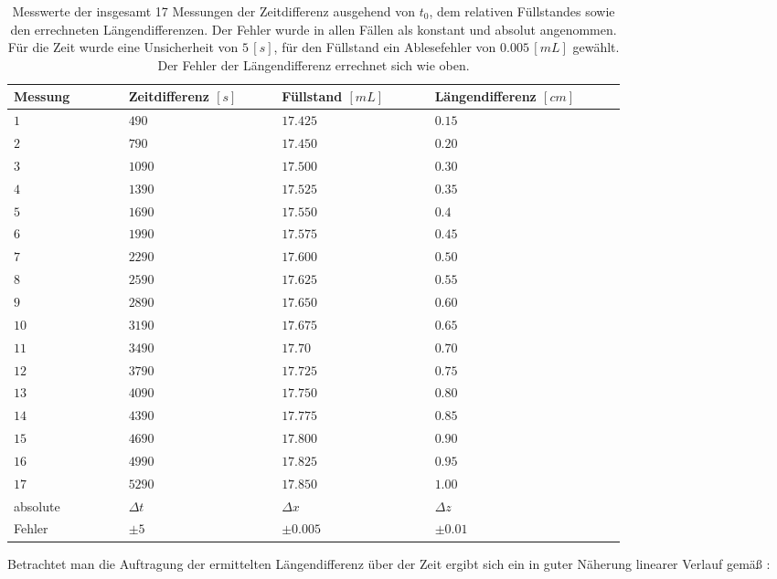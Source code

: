 \begin{table}[H]
	\centering
	\label{Messdaten}
	\caption{Messwerte der insgesamt 17 Messungen der Zeitdifferenz ausgehend von $t_0$, dem relativen Füllstandes sowie den errechneten Längendifferenzen. Der Fehler wurde in allen Fällen als konstant und absolut angenommen. Für die Zeit wurde eine Unsicherheit von $5\,[\si{s}]$, für den Füllstand ein Ablesefehler von $0.005 \,[\si{mL}]$ gewählt. Der Fehler der Längendifferenz errechnet sich wie oben.\\}
	\begin{tabular}{C{0.15\linewidth}|C{0.2\linewidth}C{0.2\linewidth}C{0.25\linewidth}}
		Messung  &  Zeitdifferenz $\left[\si{s}\right] $ &  Füllstand $\left[\si{mL}\right] $ & Längendifferenz $[\si{cm}]$\\
		\hline \addlinespace[1ex] 
		$ 1$ & $ 490 $ & $17.425$ & $0.15$\\
		$2$ & $790$& $ 17.450$ &$0.20$\\
		$3$ & $1090$& $17.500$  &$0.30$\\
		$4$ &$1390$& $17.525$ &$0.35$\\
		$5$&  $1690 $&  $17.550$ &$0.4$\\
		$6$&  $1990 $&  $17.575$ &$0.45$\\
		$7$ &  $2290$&$17.600$ &$0.50$\\
		$8$ & $2590 $&$17.625$  &$0.55$\\
		$9$ &  $2890 $& $17.650$  &$0.60$\\
		$10$ &  $3190 $& $17.675$  &$0.65$\\
		$11$ &  $3490 $& $17.70$  &$0.70$\\
		$12$ &  $3790 $& $17.725$  &$0.75$\\
		$13$ &  $4090 $& $17.750$  &$0.80$\\
		$14$ &  $4390 $& $17.775$  &$0.85$\\
		$15$ &  $4690 $& $17.800$  &$0.90$\\
		$16$ &  $4990 $& $17.825$  &$0.95$\\
		$17$ &  $5290 $& $17.850$  &$1.00$\\
		\hline \addlinespace[1ex] 
		absolute &$\Delta t$ &$\Delta x$ &$\Delta z$\\Fehler & $\pm 5$& $\pm 0.005$  & $\pm 0.01$ \\
		
	\end{tabular}
\end{table}
Betrachtet man die Auftragung der ermittelten Längendifferenz über der Zeit ergibt sich ein in guter Näherung linearer Verlauf gemäß :
